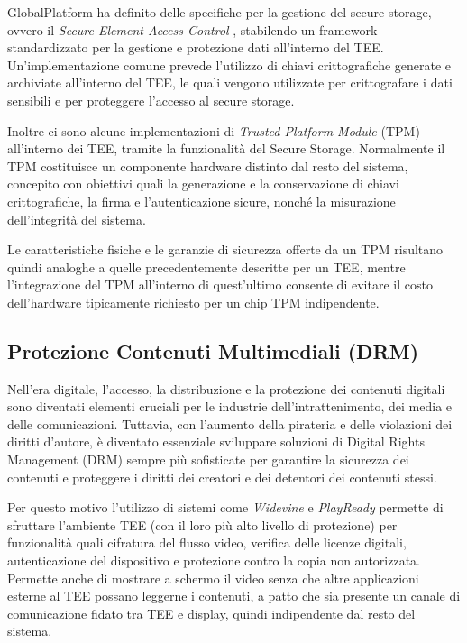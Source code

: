 \documentclass[12pt,italian]{report}
\begin{document}
	\bigbreak
	
	GlobalPlatform ha definito delle specifiche per la gestione del secure storage, ovvero il \textit{Secure Element Access Control} \cite{gp2020seac}, stabilendo un framework standardizzato per la gestione e protezione dati all'interno del TEE. Un'implementazione comune prevede l'utilizzo di chiavi crittografiche generate e archiviate all'interno del TEE, le quali vengono utilizzate per crittografare i dati sensibili e per proteggere l'accesso al secure storage.
	
	\bigbreak 
	
	Inoltre ci sono alcune implementazioni di \textit{Trusted Platform Module} (TPM) all'interno dei TEE, tramite la funzionalità del Secure Storage. Normalmente il TPM costituisce un componente hardware distinto dal resto del sistema, concepito con obiettivi quali la generazione e la conservazione di chiavi crittografiche, la firma e l'autenticazione sicure, nonché la misurazione dell'integrità del sistema.
	
	Le caratteristiche fisiche e le garanzie di sicurezza offerte da un TPM risultano quindi analoghe a quelle precedentemente descritte per un TEE, mentre l'integrazione del TPM all'interno di quest'ultimo consente di evitare il costo dell'hardware tipicamente richiesto per un chip TPM indipendente.
	
	\subsection{Protezione Contenuti Multimediali (DRM)}
	\label{subsec:drm}
	Nell'era digitale, l'accesso, la distribuzione e la protezione dei contenuti digitali sono diventati elementi cruciali per le industrie dell'intrattenimento, dei media e delle comunicazioni. Tuttavia, con l'aumento della pirateria e delle violazioni dei diritti d'autore, è diventato essenziale sviluppare soluzioni di Digital Rights Management (DRM) sempre più sofisticate per garantire la sicurezza dei contenuti e proteggere i diritti dei creatori e dei detentori dei contenuti stessi.
	
	\bigbreak
	
	Per questo motivo l'utilizzo di sistemi come \textit{Widevine} \cite{widevine} e \textit{PlayReady} \cite{playready} permette di sfruttare l'ambiente TEE (con il loro più alto livello di protezione) per funzionalità quali cifratura del flusso video, verifica delle licenze digitali, autenticazione del dispositivo e protezione contro la copia non autorizzata. Permette anche di mostrare a schermo il video senza che altre applicazioni esterne al TEE possano leggerne i contenuti, a patto che sia presente un canale di comunicazione fidato tra TEE e display, quindi indipendente dal resto del sistema.
	
\end{document}
